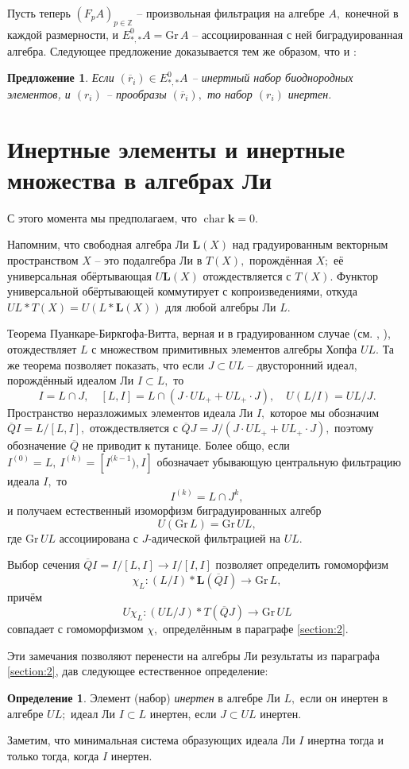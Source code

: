 \documentclass[10pt,a4paper]{article}
\DeclareMathOperator{\cchar}{char}
\def\ZZ{\mathbb{Z}}
\def\L{\mathbf{L}}
\def\k{\mathbf{k}}
\newtheorem{prp}[thm]{Предложение}
\theoremstyle{definition}
\newtheorem{dfn}[thm]{Определение}
\begin{document}
Пусть теперь $(F_pA)_{p\in\ZZ}$ -- произвольная фильтрация на алгебре $A,$ конечной в каждой размерности, и $E_{*,*}^0A=\mathrm{Gr}\,A$ -- ассоциированная с ней биградуированная алгебра. Следующее предложение доказывается тем же образом, что и \cite[теорема 3.2]{2}:
\begin{prp}\label{prp_2.9}
Если $(\overline{r}_i)\in E_{*,*}^0A$ -- инертный набор биоднородных элементов, и $(r_i)$ -- прообразы $(\overline{r}_i),$ то набор $(r_i)$ инертен.
\end{prp}
\section{Инертные элементы и инертные множества в алгебрах Ли}\label{section:3}
С этого момента мы предполагаем, что $\cchar \k=0.$

Напомним, что свободная алгебра Ли $\L(X)$ над градуированным векторным пространством $X$ -- это подалгебра Ли в $T(X),$ порождённая $X;$ её универсальная обёртывающая $U\L(X)$ отождествляется с $T(X).$ Функтор универсальной обёртывающей коммутирует с копроизведениями, откуда $UL\ast T(X)=U(L\ast \L(X))$ для любой алгебры Ли $L.$

Теорема Пуанкаре-Биркгофа-Витта, верная и в градуированном случае (см. \cite{16}, \cite[аппендикс B]{18}), отождествляет $L$ с множеством примитивных элементов алгебры Хопфа $UL.$ Та же теорема позволяет показать, что если $J\subset UL$ -- двусторонний идеал, порождённый идеалом Ли $I\subset L,$ то
$$I=L\cap J,\quad[L,I]=L\cap(J\cdot UL_+ + UL_+\cdot J),\quad U(L/I)=UL/J.$$
Пространство неразложимых элементов идеала Ли $I,$ которое мы обозначим $\overline{Q}I=L/[L,I],$ отождествляется с $\overline{Q}J=J/(J\cdot UL_++UL_+\cdot J),$ поэтому обозначение $\overline{Q}$ не приводит к путанице. Более общо, если $I^{(0)}=L,~I^{(k)}=[I^{(k-1}),I]$ обозначает убывающую центральную фильтрацию идеала $I,$ то $$I^{(k)}=L\cap J^k,$$ и получаем естественный изоморфизм биградуированных алгебр
$$U(\mathrm{Gr}\,L) = \mathrm{Gr}\, UL,$$ где $\mathrm{Gr}\, UL$ ассоциирована с $J$-адической фильтрацией на $UL.$

Выбор сечения $\overline{Q}I=I/[L,I]\to I/[I,I]$ позволяет определить гомоморфизм
$$\chi_L:(L/I)\ast \L(\overline{Q}I)\to \mathrm{Gr}\,L,$$ причём
$$U\chi_L:(UL/J)\ast T(\overline{Q}J)\to \mathrm{Gr}\, UL$$ совпадает с гомоморфизмом $\chi,$ определённым в параграфе \ref{section:2}.

Эти замечания позволяют перенести на алгебры Ли результаты из параграфа \ref{section:2}, дав следующее естественное определение:
\begin{dfn}\label{dfn_3.1}
Элемент (набор) \emph{инертен} в алгебре Ли $L,$ если он инертен в алгебре $UL;$ идеал Ли $I\subset L$ инертен, если $J\subset UL$ инертен.
\end{dfn}
Заметим, что минимальная система образующих идеала Ли $I$ инертна тогда и только тогда, когда $I$ инертен.
\end{document}
